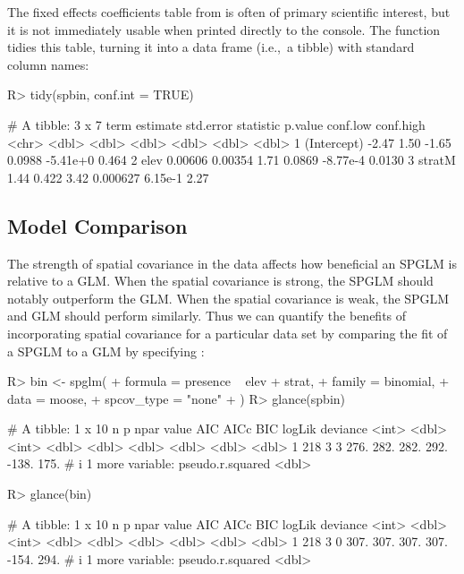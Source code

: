 \documentclass[
]{jss}
\begin{document}
The fixed effects coefficients table from  is often of
primary scientific interest, but it is not immediately usable when
printed directly to the  console. The  function
tidies this table, turning it into a data frame (i.e.,~a tibble) with
standard column names:

\begin{CodeChunk}
\begin{CodeInput}
R> tidy(spbin, conf.int = TRUE)
\end{CodeInput}
\begin{CodeOutput}
# A tibble: 3 x 7
  term        estimate std.error statistic  p.value conf.low conf.high
  <chr>          <dbl>     <dbl>     <dbl>    <dbl>    <dbl>     <dbl>
1 (Intercept) -2.47      1.50        -1.65 0.0988   -5.41e+0    0.464 
2 elev         0.00606   0.00354      1.71 0.0869   -8.77e-4    0.0130
3 stratM       1.44      0.422        3.42 0.000627  6.15e-1    2.27  
\end{CodeOutput}
\end{CodeChunk}

\subsection{Model Comparison}\label{model-comparison}

The strength of spatial covariance in the data affects how beneficial an
SPGLM is relative to a GLM. When the spatial covariance is strong, the
SPGLM should notably outperform the GLM. When the spatial covariance is
weak, the SPGLM and GLM should perform similarly. Thus we can quantify
the benefits of incorporating spatial covariance for a particular data
set by comparing the fit of a SPGLM to a GLM by specifying
:

\begin{CodeChunk}
\begin{CodeInput}
R> bin <- spglm(
+    formula = presence ~ elev + strat,
+    family = binomial,
+    data = moose,
+    spcov_type = "none"
+  )
R> glance(spbin)
\end{CodeInput}
\begin{CodeOutput}
# A tibble: 1 x 10
      n     p  npar value   AIC  AICc   BIC logLik deviance
  <int> <dbl> <int> <dbl> <dbl> <dbl> <dbl>  <dbl>    <dbl>
1   218     3     3  276.  282.  282.  292.  -138.     175.
# i 1 more variable: pseudo.r.squared <dbl>
\end{CodeOutput}
\begin{CodeInput}
R> glance(bin)
\end{CodeInput}
\begin{CodeOutput}
# A tibble: 1 x 10
      n     p  npar value   AIC  AICc   BIC logLik deviance
  <int> <dbl> <int> <dbl> <dbl> <dbl> <dbl>  <dbl>    <dbl>
1   218     3     0  307.  307.  307.  307.  -154.     294.
# i 1 more variable: pseudo.r.squared <dbl>
\end{CodeOutput}
\end{CodeChunk}
\end{document}
